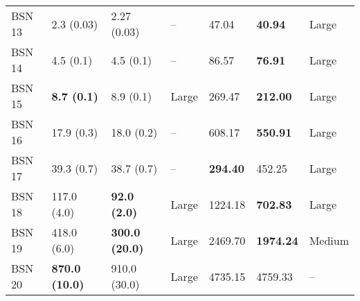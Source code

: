 \begin{tabular}{lllllll}
 BSN 13 &             2.3 (0.03) &            2.27 (0.03) &          -- &                   47.04 &           \textbf{40.94} &       Large \\
 BSN 14 &              4.5 (0.1) &              4.5 (0.1) &          -- &                   86.57 &           \textbf{76.91} &       Large \\
 BSN 15 &     \textbf{8.7 (0.1)} &              8.9 (0.1) &       Large &                  269.47 &          \textbf{212.00} &       Large \\
 BSN 16 &             17.9 (0.3) &             18.0 (0.2) &          -- &                  608.17 &          \textbf{550.91} &       Large \\
 BSN 17 &             39.3 (0.7) &             38.7 (0.7) &          -- &         \textbf{294.40} &                   452.25 &       Large \\
 BSN 18 &            117.0 (4.0) &    \textbf{92.0 (2.0)} &       Large &                 1224.18 &          \textbf{702.83} &       Large \\
 BSN 19 &            418.0 (6.0) &  \textbf{300.0 (20.0)} &       Large &                 2469.70 &         \textbf{1974.24} &      Medium \\
 BSN 20 &  \textbf{870.0 (10.0)} &           910.0 (30.0) &       Large &                 4735.15 &                  4759.33 &          -- \\
\bottomrule
\end{tabular}
